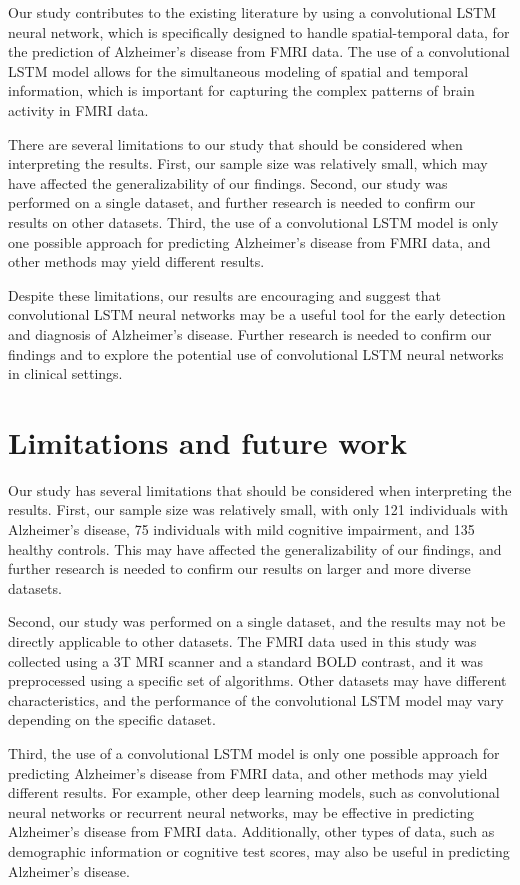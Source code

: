\documentclass[10pt]{article}
\begin{document}
	Our study contributes to the existing literature by using a convolutional LSTM neural network, which is specifically designed to handle spatial-temporal data, for the prediction of Alzheimer's disease from FMRI data. The use of a convolutional LSTM model allows for the simultaneous modeling of spatial and temporal information, which is important for capturing the complex patterns of brain activity in FMRI data.

	There are several limitations to our study that should be considered when interpreting the results. First, our sample size was relatively small, which may have affected the generalizability of our findings. Second, our study was performed on a single dataset, and further research is needed to confirm our results on other datasets. Third, the use of a convolutional LSTM model is only one possible approach for predicting Alzheimer's disease from FMRI data, and other methods may yield different results.

	Despite these limitations, our results are encouraging and suggest that convolutional LSTM neural networks may be a useful tool for the early detection and diagnosis of Alzheimer's disease. Further research is needed to confirm our findings and to explore the potential use of convolutional LSTM neural networks in clinical settings.

	\section{Limitations and future work}

	Our study has several limitations that should be considered when interpreting the results. First, our sample size was relatively small, with only 121 individuals with Alzheimer's disease, 75 individuals with mild cognitive impairment, and 135 healthy controls. This may have affected the generalizability of our findings, and further research is needed to confirm our results on larger and more diverse datasets.

	Second, our study was performed on a single dataset, and the results may not be directly applicable to other datasets. The FMRI data used in this study was collected using a 3T MRI scanner and a standard BOLD contrast, and it was preprocessed using a specific set of algorithms. Other datasets may have different characteristics, and the performance of the convolutional LSTM model may vary depending on the specific dataset.

	Third, the use of a convolutional LSTM model is only one possible approach for predicting Alzheimer's disease from FMRI data, and other methods may yield different results. For example, other deep learning models, such as convolutional neural networks or recurrent neural networks, may be effective in predicting Alzheimer's disease from FMRI data. Additionally, other types of data, such as demographic information or cognitive test scores, may also be useful in predicting Alzheimer's disease.
\end{document}
